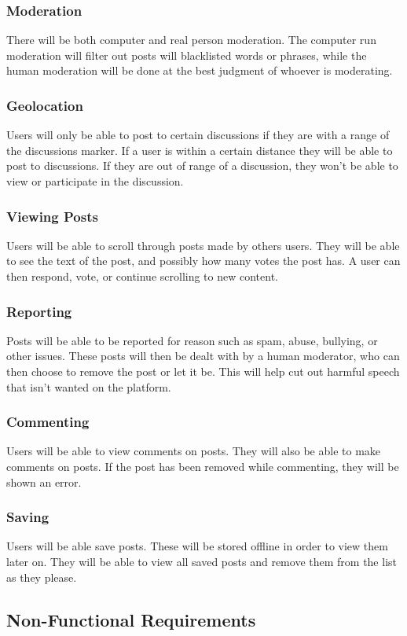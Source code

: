 \documentclass[12pt]{article}
\begin{document}
\subsubsection{Moderation}
There will be both computer and real person moderation.  The computer run moderation will filter out posts will blacklisted words or phrases, while the human moderation will be done at the best judgment of whoever is moderating.
\subsubsection{Geolocation}
Users will only be able to post to certain discussions if they are with a range of the discussions marker.  If a user is within a certain distance they will be able to post to discussions.  If they are out of range of a discussion, they won’t be able to view or participate in the discussion.
\subsubsection{Viewing Posts}
Users will be able to scroll through posts made by others users.  They will be able to see the text of the post, and possibly how many votes the post has.  A user can then respond, vote, or continue scrolling to new content.
\subsubsection{Reporting}
Posts will be able to be reported for reason such as spam, abuse, bullying, or other issues.  These posts will then be dealt with by a human moderator, who can then choose to remove the post or let it be.  This will help cut out harmful speech that isn’t wanted on the platform.
\subsubsection{Commenting}
Users will be able to view  comments on posts. They will also be able to make comments on posts. If the post has been removed while commenting, they will be shown an error.
\subsubsection{Saving}
Users will be able save posts. These will be stored offline in order to view them later on. They will be able to view all saved posts and remove them from the list as they please.
\subsection{Non-Functional Requirements}
\end{document}
